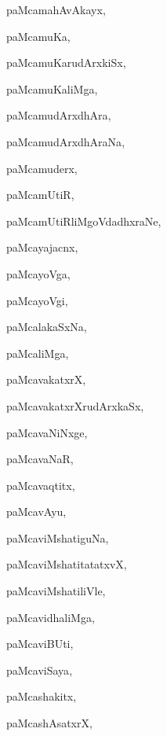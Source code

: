 \begin{multicols}{3}
{\noindent
{paMcamahAvAkayx}, \pageref{paMcamahAvAkayx}

\noindent
{paMcamuKa}, \pageref{paMcamuKa}

\noindent
{paMcamuKarudArxkiSx}, \pageref{paMcamuKarudArxkiSx}

\noindent
{paMcamuKaliMga}, \pageref{paMcamuKaliMga}

\noindent
{paMcamudArxdhAra}, \pageref{paMcamudArxdhAra}

\noindent
{paMcamudArxdhAraNa}, \pageref{paMcamudArxdhAraNa}

\noindent
{paMcamuderx}, \pageref{paMcamuderx}

\noindent
{paMcamUtiR}, \pageref{paMcamUtiR}

\noindent
{paMcamUtiRliMgoVdadhxraNe}, \pageref{paMcamUtiRliMgoVdadhxraNe}

\noindent
{paMcayajacnx}, \pageref{paMcayajacnx}

\noindent
{paMcayoVga}, \pageref{paMcayoVga}

\noindent
{paMcayoVgi}, \pageref{paMcayoVgi}

\noindent
{paMcalakaSxNa}, \pageref{paMcalakaSxNa}

\noindent
{paMcaliMga}, \pageref{paMcaliMga}

\noindent
{paMcavakatxrX}, \pageref{paMcavakatxrX}

\noindent
{paMcavakatxrXrudArxkaSx}, \pageref{paMcavakatxrXrudArxkaSx}

\noindent
{paMcavaNiNxge}, \pageref{paMcavaNiNxge}

\noindent
{paMcavaNaR}, \pageref{paMcavaNaR}

\noindent
{paMcavaqtitx}, \pageref{paMcavaqtitx}

\noindent
{paMcavAyu}, \pageref{paMcavAyu}

\noindent
{paMcaviMshatiguNa}, \pageref{paMcaviMshatiguNa}

\noindent
{paMcaviMshatitatatxvX}, \pageref{paMcaviMshatitatatxvX}

\noindent
{paMcaviMshatiliVle}, \pageref{paMcaviMshatiliVle}

\noindent
{paMcavidhaliMga}, \pageref{paMcavidhaliMga}

\noindent
{paMcaviBUti}, \pageref{paMcaviBUti}

\noindent
{paMcaviSaya}, \pageref{paMcaviSaya}

\noindent
{paMcashakitx}, \pageref{paMcashakitx}

\noindent
{paMcashAsatxrX}, \pageref{paMcashAsatxrX}

}
\end{multicols}

